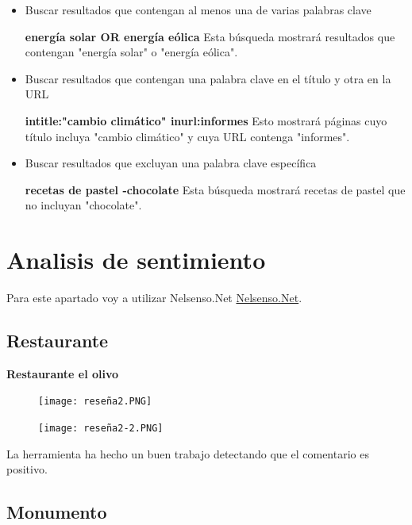 \documentclass[12pt]{article}
\begin{document}
\begin{itemize}
    \item Buscar resultados que contengan al menos una de varias palabras clave

    \textbf{energía solar OR energía eólica} Esta búsqueda mostrará resultados que contengan "energía solar" o "energía eólica".

    \item Buscar resultados que contengan una palabra clave en el título y otra en la URL

    \textbf{intitle:"cambio climático" inurl:informes} Esto mostrará páginas cuyo título incluya "cambio climático" y cuya URL contenga "informes".
    
    \item Buscar resultados que excluyan una palabra clave específica
    
    \textbf{recetas de pastel -chocolate} Esta búsqueda mostrará recetas de pastel que no incluyan "chocolate".
\end{itemize}

\section{Analisis de sentimiento}

Para este apartado voy a utilizar Nelsenso.Net \href{https://www.nelsenso.net/es/tonetizer.aspx}{Nelsenso.Net}.

\subsection{Restaurante}

\textbf{Restaurante el olivo}

\begin{figure}[h!]
    \centering
    \texttt{[image: reseña2.PNG]}
    \label{fig:my_label}
\end{figure}

\begin{figure}[h!]
    \centering
    \texttt{[image: reseña2-2.PNG]}
    \label{fig:my_label}
\end{figure}

La herramienta ha hecho un buen trabajo detectando que el comentario es positivo.

\clearpage

\subsection{Monumento}
\end{document}
